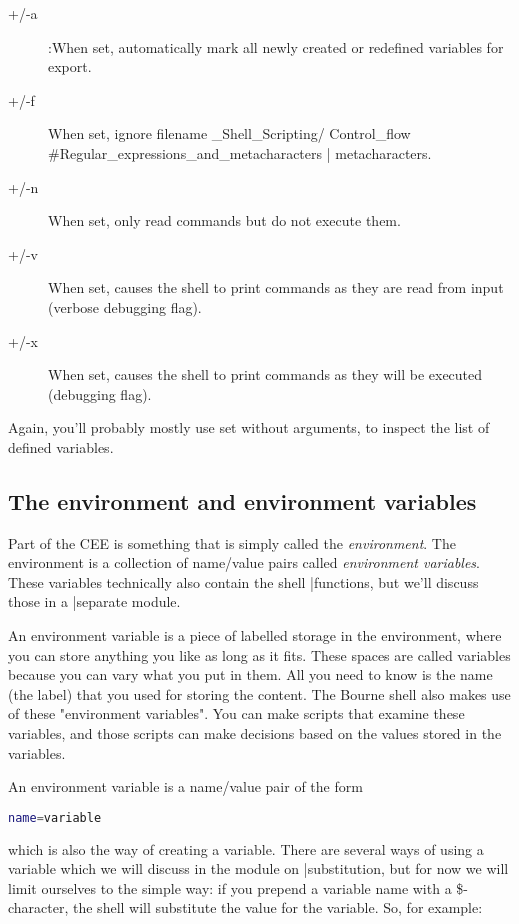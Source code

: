 \begin{description}
\item[+/-a]:When set, automatically mark all newly created or redefined variables for export.
\item[+/-f]When set, ignore filename \_Shell\_Scripting/ Control\_flow \#Regular\_expressions\_and\_metacharacters | metacharacters.
\item[+/-n]When set, only read commands but do not execute them.
\item[+/-v]When set, causes the shell to print commands as they are read from input (verbose debugging flag).
\item[+/-x]When set, causes the shell to print commands as they will be executed (debugging flag).
\end{description}

Again, you'll probably mostly use set without arguments, to inspect the list of
defined variables.

\subsection{The environment and environment variables}
Part of the CEE is something that is simply called the \textit{environment}.
The environment is a collection of name/value pairs called \textit{environment variables}.
These variables technically also contain the shell |functions, but
we'll discuss those in a |separate module.

An environment variable is a piece of labelled storage in the environment,
where you can store anything you like as long as it fits. These spaces are
called variables because you can vary what you put in them. All you need to
know is the name (the label) that you used for storing the content. The Bourne
shell also makes use of these "environment variables". You can make scripts
that examine these variables, and those scripts can make decisions based on the
values stored in the variables.

An environment variable is a name/value pair of the form

\lstset{basicstyle=\scriptsize, numbers=left, captionpos=b, tabsize=4}
\begin{lstlisting}[language={bash},
xleftmargin=15pt]
name=variable
\end{lstlisting}

which is also the way of creating a variable. There are several ways of using a
variable which we will discuss in the module on |substitution, but for now we
will limit ourselves to the simple way: if you prepend a variable name with a
\$-character, the shell will substitute the value for the variable. So, for
example:

